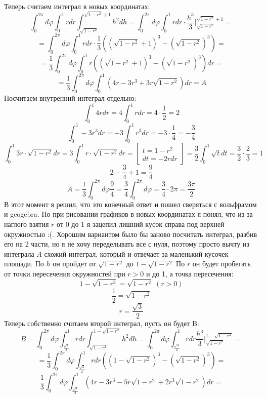 \documentclass[a4paper,12pt]{article}
\begin{document}
Теперь считаем интеграл в новых координатах:
\[
 \int_0^{2\pi} d \varphi \int_0^1 r dr \int_{\sqrt{1-r^2}}^{\sqrt{1-r^2}+1}h^2 dh  = \int_0^{2\pi} d \varphi \int_0^1 r dr  \cdot \frac{h^3}{3} \Bigg|_{\sqrt{1-r^2}}^{\sqrt{1-r^2}+1} = 
\]
\[
=
\int_0^{2\pi} d \varphi \int_0^1 r dr  \cdot \frac{1}{3} \left( \left( \sqrt{1-r^2} + 1\right)^3 - \left(\sqrt{1-r^2}\right)^3 \right) =
\]
\[
=
\frac13 \int_0^{2\pi} d \varphi \int_0^1 r \left( \left( \sqrt{1-r^2} + 1\right)^3 - \left(\sqrt{1-r^2}\right)^3 \right)  dr = 
\]
\[
=
\frac13 \int_0^{2\pi} d \varphi \int_0^1 \left( 4r - 3 r^3 + 3r \sqrt{1 - r^2}\right)  dr = A
\]
Посчитаем внутренний интеграл отдельно:
\[
\int_0^1 4r dr =  4 \int_0^1 r dr  = 4 \cdot \frac{1}{2} = 2
\]
\[
\int_0^1 -3r^3dr = -3 \int_0^1 r^3 dr = -3 \cdot \frac14 = -\frac34
\]
\[
\int_0^1 3r \cdot  \sqrt{1-r^2} dr =  3 \int_0^1 r \cdot  \sqrt{1-r^2} dr  = \begin{bmatrix} t = 1 - r^2 \\ dt = -2rdr \end{bmatrix} = \frac32 \int_0^1 \sqrt{t}dt =\frac32 \cdot \frac23 = 1
\]
\[
2 - \frac34 + 1 = \frac94
\]
\[
A = 
 \frac13 \int_0^{2\pi} d \varphi \frac{9}{4} = \frac{3}{4}\int_0^{2\pi} d \varphi = \frac{3}{4} \cdot 2\pi  = \frac{3\pi}{2}
\]
В этот момент я решил, что это конечный ответ и пошел сверяться с вольфрамом и geogebra. Но при рисовании графиков в новых координатах я понял, что из-за наглого взятия  $r$ от 0 до 1 я зацепил лишний кусок справа под верхней окружностью :(. Хорошим вариантом было бы заново посчитать интеграл, разбив его на 2 части, но я не хочу переделывать все с нуля, поэтому просто вычту из интеграла $A$ схожий интеграл, который и отвечает за маленький кусочек площади. По $h$ он пройдет от $\sqrt{1-r^2}$ до $1 - \sqrt{1-r^2}$
 По $r$ он будет пробегать от точки пересечения окружностей при $r > 0$ и до 1, а точка пересечения:
\[
1 - \sqrt{1-r^2} = \sqrt{1-r^2} \;  (r > 0)
\]
\[
\frac{1}{2} = \sqrt{1-r^2}
\]
\[
r = \frac{\sqrt{3}}{2}  
\]
Теперь собственно считаем второй интеграл, пусть он будет B:
\[
B = \int_0^{2\pi} d \varphi \int_{\frac{\sqrt{3}}{2}}^1 rdr \int_{\sqrt{1-r^2}}^{1 - \sqrt{1-r^2}} h^2 dh =\int_0^{2\pi} d \varphi \int_{\frac{\sqrt{3}}{2}}^1 rdr \frac{h^3}{3} \Bigg|_{\sqrt{1-r^2}}^{1 - \sqrt{1-r^2}} =
\]
\[
= \frac{1}{3}\int_0^{2\pi} d \varphi \int_{\frac{\sqrt{3}}{2}}^1 rdr \left(  
\left(
1 - \sqrt{1-r^2}
\right)^3
-
\left(
\sqrt{1-r^2}
\right)^3
\right) =
\]
\[
\frac{1}{3}\int_0^{2\pi} d \varphi \int_{\frac{\sqrt{3}}{2}}^1 \left(
4 r - 3 r^3 - 5 r \sqrt{1 - r^2} + 2 r^3 \sqrt{1 - r^2} \right)dr = 
\]
\end{document}
